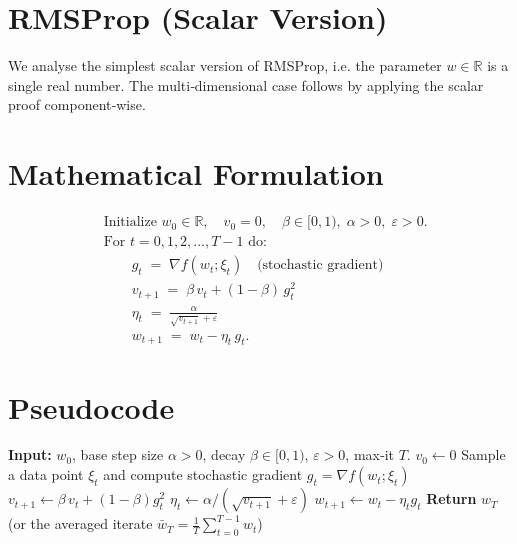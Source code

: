 \documentclass[11pt]{article}
\newcommand{\R}{\mathbb{R}}
\begin{document}
\section*{RMSProp (Scalar Version)}

We analyse the simplest scalar version of RMSProp, i.e. the parameter $w\in\R$ is a single real number.  The multi‑dimensional case follows by applying the scalar proof component‑wise.

\section*{Mathematical Formulation}
\begin{align}
    &\text{Initialize } w_0\in\R,\quad v_0=0, \quad \beta\in[0,1),\;\alpha>0,\;\varepsilon>0. \nonumber\\[4pt]
    &\text{For } t=0,1,2,\dots,T-1 \text{ do: } \nonumber\\
    &\qquad g_t \;=\; \nabla f(w_t;\xi_t) \quad\text{(stochastic gradient)}\label{eq:gt}\\
    &\qquad v_{t+1} \;=\; \beta\,v_t + (1-\beta)\,g_t^{2} \label{eq:vt}\\
    &\qquad \eta_t \;=\; \frac{\alpha}{\sqrt{v_{t+1}}+\varepsilon} \label{eq:stepsize}\\
    &\qquad w_{t+1} \;=\; w_t - \eta_t\, g_t . \label{eq:update}
\end{align}

\section*{Pseudocode}
\begin{algorithm}[H]
\caption{RMSProp (scalar)}\label{alg:rmsprop}
\begin{algorithmic}[1]
\State \textbf{Input:} $w_0$, base step size $\alpha>0$, decay $\beta\in[0,1)$, $\varepsilon>0$, max‑it $T$.
\State $v_0\gets 0$
    \State Sample a data point $\xi_t$ and compute stochastic gradient $g_t=\nabla f(w_t;\xi_t)$
    \State $v_{t+1}\gets \beta\,v_t + (1-\beta)g_t^{2}$
    \State $\eta_t \gets \alpha/(\sqrt{v_{t+1}}+\varepsilon)$
    \State $w_{t+1}\gets w_t - \eta_t g_t$
\EndFor
\State \textbf{Return} $w_T$ (or the averaged iterate $\bar w_T=\frac1T\sum_{t=0}^{T-1} w_t$)
\end{algorithmic}
\end{algorithm}
\end{document}

